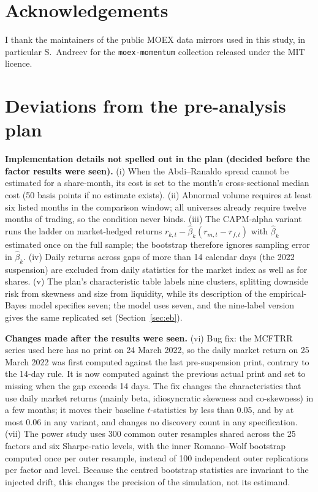 \documentclass[11pt]{article}
\newcommand{\RW}{Romano--Wolf}
\begin{document}
\section*{Acknowledgements}
I thank the maintainers of the public MOEX data mirrors used in this study, in particular S.~Andreev for the
\texttt{moex-momentum} collection released under the MIT licence.

\FloatBarrier
\clearpage

{\sloppy
}

\appendix
\clearpage
\section{Deviations from the pre-analysis plan}\label{app:deviations}

\textbf{Implementation details not spelled out in the plan (decided before the factor results were seen).}
(i) When the Abdi--Ranaldo spread cannot be estimated for a share-month, its cost is set to the month's
cross-sectional median cost (50 basis points if no estimate exists). (ii) Abnormal volume requires at least six listed
months in the comparison window; all universes already require twelve months of trading, so the condition never binds.
(iii) The CAPM-alpha variant runs the ladder on market-hedged returns $r_{k,t}-\hat\beta_k(r_{m,t}-r_{f,t})$ with
$\hat\beta_k$ estimated once on the full sample; the bootstrap therefore ignores sampling error in $\hat\beta_k$.
(iv) Daily returns across gaps of more than 14 calendar days (the 2022 suspension) are excluded from daily statistics
for the market index as well as for shares. (v) The plan's characteristic table labels nine clusters, splitting downside
risk from skewness and size from liquidity, while its description of the empirical-Bayes model specifies seven; the
model uses seven, and the nine-label version gives the same replicated set (Section~\ref{sec:eb}).

\textbf{Changes made after the results were seen.} (vi) Bug fix: the MCFTRR series used here has no
print on 24 March 2022, so the daily market return on 25 March 2022 was first computed against the last pre-suspension
print, contrary to the 14-day rule.
It is now computed against the previous actual print and set to missing when the gap exceeds 14 days. The fix changes
the characteristics that use daily market returns (mainly beta, idiosyncratic skewness and co-skewness) in a few months;
it moves their baseline $t$-statistics by less than 0.05, and by at most 0.06 in any variant, and changes no discovery
count in any specification. (vii) The power study uses 300 common outer
resamples shared across the 25 factors and six Sharpe-ratio levels, with the inner \RW{} bootstrap computed once per
outer resample, instead of 100 independent outer replications per factor and level. Because the centred bootstrap
statistics are invariant to the injected drift, this changes the precision of the simulation, not its estimand.
\end{document}
